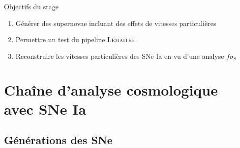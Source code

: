 \documentclass{beamer}
\newcommand{\lemaitre}{\textsc{Lemaître}\xspace}
\begin{document}
\begin{frame}{Objectifs du stage}
\begin{enumerate}
\itemsep2em 
\item Générer des supernovae incluant des effets de vitesses particulières
\item Permettre un test du pipeline \lemaitre
\item Reconstruire les vitesses particulières des SNe Ia en vu d'une analyse $f\sigma_8$
\end{enumerate}
\end{frame}

\section{Chaîne d'analyse cosmologique avec SNe Ia}



\subsection{Générations des SNe}
\end{document}
